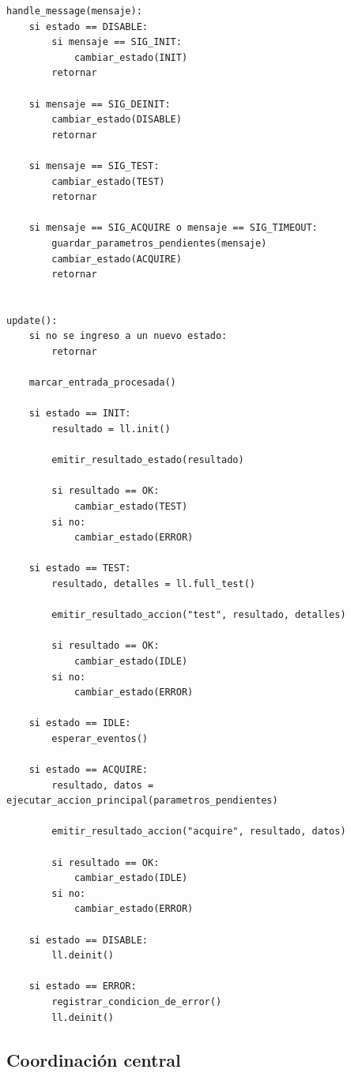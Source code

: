\begin{lstlisting}[style=pseudocodigo, caption={Pseudocódigo del ciclo de operación de una Máquina de Estados Finitos.}, label={lst:ciclo_fsm}]
handle_message(mensaje):
    si estado == DISABLE:
        si mensaje == SIG_INIT:
            cambiar_estado(INIT)
        retornar

    si mensaje == SIG_DEINIT:
        cambiar_estado(DISABLE)
        retornar

    si mensaje == SIG_TEST:
        cambiar_estado(TEST)
        retornar

    si mensaje == SIG_ACQUIRE o mensaje == SIG_TIMEOUT:
        guardar_parametros_pendientes(mensaje)
        cambiar_estado(ACQUIRE)
        retornar


update():
    si no se ingreso a un nuevo estado:
        retornar

    marcar_entrada_procesada()

    si estado == INIT:
        resultado = ll.init()

        emitir_resultado_estado(resultado)

        si resultado == OK:
            cambiar_estado(TEST)
        si no:
            cambiar_estado(ERROR)

    si estado == TEST:
        resultado, detalles = ll.full_test()

        emitir_resultado_accion("test", resultado, detalles)

        si resultado == OK:
            cambiar_estado(IDLE)
        si no:
            cambiar_estado(ERROR)

    si estado == IDLE:
        esperar_eventos()

    si estado == ACQUIRE:
        resultado, datos = ejecutar_accion_principal(parametros_pendientes)

        emitir_resultado_accion("acquire", resultado, datos)

        si resultado == OK:
            cambiar_estado(IDLE)
        si no:
            cambiar_estado(ERROR)

    si estado == DISABLE:
        ll.deinit()

    si estado == ERROR:
        registrar_condicion_de_error()
        ll.deinit()
\end{lstlisting}

\subsection{Coordinación central}

